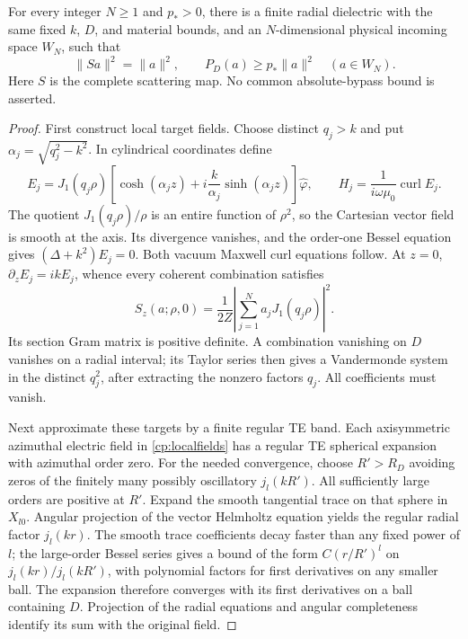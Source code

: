 \begin{theorem}
\label{cp:rank}
For every integer $N\geq1$ and $p_*>0$, there is a finite radial
dielectric with the same fixed $k$, $D$, and material bounds, and an
$N$-dimensional physical incoming space $W_N$, such that
\begin{equation}\label{cp:passage}
 \|Sa\|^2=\|a\|^2,\qquad P_D(a)\geq p_*\|a\|^2
       \quad(a\in W_N).
\end{equation}
Here $S$ is the complete scattering map. No common absolute-bypass
bound is asserted.
\end{theorem}
\begin{proof}
First construct local target fields. Choose distinct $q_j>k$ and
put $\alpha_j=\sqrt{q_j^2-k^2}$. In cylindrical coordinates define
\begin{equation}\label{cp:localfields}
 E_j=J_1(q_j\rho)
       \left[\cosh(\alpha_jz)+i\frac{k}{\alpha_j}
                          \sinh(\alpha_jz)\right]\widehat\varphi,
 \qquad H_j=\frac1{i\omega\mu_0}\operatorname{curl}E_j.
\end{equation}
The quotient $J_1(q_j\rho)/\rho$ is an entire function of $\rho^2$,
so the Cartesian vector field is smooth at the axis. Its divergence
vanishes, and the order-one Bessel equation gives
$(\Delta+k^2)E_j=0$. Both vacuum Maxwell curl equations follow.
At $z=0$, $\partial_zE_j=ikE_j$, whence every coherent combination
satisfies
\begin{equation}\label{cp:positivegram}
 S_z(a;\rho,0)=\frac1{2Z}
                 \left|\sum_{j=1}^Na_jJ_1(q_j\rho)\right|^2.
\end{equation}
Its section Gram matrix is positive definite. A combination
vanishing on $D$ vanishes on a radial interval; its Taylor series
then gives a Vandermonde system in the distinct $q_j^2$, after
extracting the nonzero factors $q_j$. All coefficients must vanish.

Next approximate these targets by a finite regular TE band. Each
axisymmetric azimuthal electric field in \eqref{cp:localfields} has
a regular TE spherical expansion with azimuthal order zero.
For the needed convergence, choose $R'>R_D$ avoiding zeros of the
finitely many possibly oscillatory $j_l(kR')$. All sufficiently
large orders are positive at $R'$. Expand the smooth tangential
trace on that sphere in $X_{l0}$. Angular projection of the vector
Helmholtz equation yields the regular radial factor $j_l(kr)$.
The smooth trace coefficients decay faster than any fixed power
of $l$; the large-order Bessel series gives a bound of the form
$C(r/R')^l$ on $j_l(kr)/j_l(kR')$, with polynomial factors for
first derivatives on any smaller ball. The expansion therefore
converges with its first derivatives on a ball containing $D$.
Projection of the radial equations and angular completeness
identify its sum with the original field.


\end{proof}
